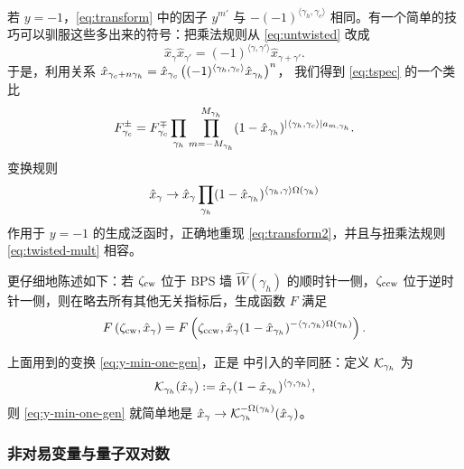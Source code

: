 若 $y=-1$，\eqref{eq:transform} 中的因子 $y^{m'}$ 与 $- (-1)^{\langle \gamma_h, \gamma_c\rangle }$ 相同。有一个简单的技巧可以驯服这些多出来的符号：把乘法规则从 \eqref{eq:untwisted} 改成
\begin{equation} \label{eq:twisted-mult}
\hat x_{\gamma} \hat x_{\gamma'} = (-1)^{\langle \gamma, \gamma'\rangle } \hat x_{\gamma +\gamma'}.
\end{equation}
于是，利用关系
$\hat x_{\gamma_c + n \gamma_h} = \hat x_{\gamma_c} \left( (-1)^{\langle \gamma_h, \gamma_c \rangle} \hat x_{\gamma_h} \right)^n$，
我们得到 \eqref{eq:tspec} 的一个类比
\begin{equation} \label{eq:transform2}
F^\pm_{\gamma_c}  = F^\mp_{\gamma_c}  \prod_{\gamma_h}
\prod_{m=-M_{\gamma_h}}^{M_{\gamma_h}} (1 -
\hat x_{\gamma_h} )^{ \lvert \langle \gamma_h, \gamma_c \rangle \rvert a_{m,\gamma_h}}.
\end{equation}
变换规则
\begin{equation}\label{eq:y-min-one-gen}
\hat x_\gamma \to \hat x_\gamma  \prod_{\gamma_h}
(1 - \hat x_{\gamma_h} )^{\langle \gamma_h, \gamma \rangle \Omega(\gamma_h)}
\end{equation}
作用于 $y=-1$ 的生成泛函时，正确地重现 \eqref{eq:transform2}，并且与扭乘法规则 \eqref{eq:twisted-mult} 相容。

更仔细地陈述如下：若 $\zeta_{\rm cw}$ 位于 BPS 墙 $\widehat{W}(\gamma_h)$ 的顺时针一侧，$\zeta_{\rm ccw}$ 位于逆时针一侧，则在略去所有其他无关指标后，生成函数 $F$ 满足
\begin{equation}\label{eq:Careful-rule}
F\left(\zeta_{\rm cw}, \hat x_\gamma\right) = F\left(\zeta_{\rm ccw} , \hat x_\gamma (1- \hat x_{\gamma_h})^{-\langle \gamma, \gamma_h\rangle \Omega(\gamma_h)} \right).
\end{equation}

上面用到的变换 \eqref{eq:y-min-one-gen}，正是 \cite{ks1} 中引入的辛同胚：定义 $\mathcal{K}_{\gamma_h}$ 为
\begin{equation}\label{eq:KS-sympo}
\mathcal{K}_{\gamma_h}(\hat x_\gamma) := \hat x_\gamma (1-\hat x_{\gamma_h})^{\langle
\gamma, \gamma_h \rangle },
\end{equation}
则 \eqref{eq:y-min-one-gen} 就简单地是
$\hat x_\gamma \to \mathcal{K}_{\gamma_h}^{-\Omega(\gamma_h)}(\hat x_\gamma)$。

\subsubsection{非对易变量与量子双对数}

